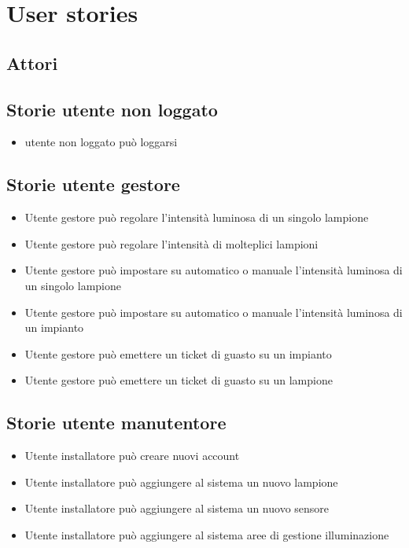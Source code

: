 \chapter{User stories}

\section{Attori}\label{attori}

\section{Storie utente non loggato}

\begin{itemize}
    \item utente non loggato può loggarsi
\end{itemize}

\section{Storie utente gestore}

\begin{itemize}
    \item Utente gestore può regolare l'intensità luminosa di un singolo lampione
    \item Utente gestore può regolare l'intensità di molteplici lampioni
    \item Utente gestore può impostare su automatico o manuale l'intensità luminosa di un singolo lampione
    \item Utente gestore può impostare su automatico o manuale l'intensità luminosa di un impianto
    \item Utente gestore può emettere un ticket di guasto su un impianto
    \item Utente gestore può emettere un ticket di guasto su un lampione
\end{itemize}



\section{Storie utente manutentore}
\begin{itemize}
    \item Utente installatore può creare nuovi account
    \item Utente installatore può aggiungere al sistema un nuovo lampione
    \item Utente installatore può aggiungere al sistema un nuovo sensore
    \item Utente installatore può aggiungere al sistema aree di gestione illuminazione
\end{itemize}


